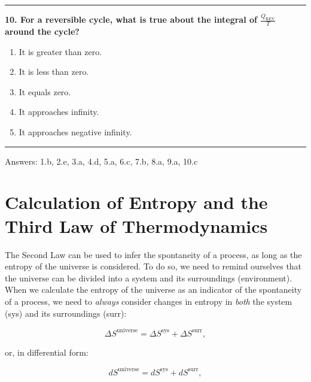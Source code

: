 \documentclass[
  9pt,
]{extbook}
\providecommand{\tightlist}{%
  \setlength{\itemsep}{0pt}\setlength{\parskip}{0pt}}
\theoremstyle{definition}
\theoremstyle{definition}
\theoremstyle{definition}
\theoremstyle{remark}
\begin{document}
\begin{center}\rule{0.5\linewidth}{0.5pt}\end{center}

\textbf{10. For a reversible cycle, what is true about the integral of \(\frac{Q_{\text{REV}}}{T}\) around the cycle?}

\begin{enumerate}
\def\labelenumi{\alph{enumi}.}
\tightlist
\item
  It is greater than zero.
\item
  It is less than zero.
\item
  It equals zero.
\item
  It approaches infinity.
\item
  It approaches negative infinity.
\end{enumerate}

\begin{center}\rule{0.5\linewidth}{0.5pt}\end{center}

Answers: 1.b, 2.e, 3.a, 4.d, 5.a, 6.c, 7.b, 8.a, 9.a, 10.c

\renewcommand*{\standardstate}{{-\kern-6pt{\ominus}\kern-6pt-}}

\hypertarget{thirdlaw}{%
\chapter{Calculation of Entropy and the Third Law of Thermodynamics}\label{thirdlaw}}

The Second Law can be used to infer the spontaneity of a process, as long as the entropy of the universe is considered. To do so, we need to remind ourselves that the universe can be divided into a system and its surroundings (environment). When we calculate the entropy of the universe as an indicator of the spontaneity of a process, we need to \emph{always} consider changes in entropy in \emph{both} the system (sys) and its surroundings (surr):

\begin{equation}
\Delta S^{\mathrm{universe}} = \Delta S^{\mathrm{sys}} + \Delta S^{\mathrm{surr}},
\label{eq:dsuniv}
\end{equation}

or, in differential form:

\begin{equation}
d S^{\mathrm{universe}} = d S^{\mathrm{sys}} + d S^{\mathrm{surr}},
\label{eq:dsunivd}
\end{equation}
\end{document}
